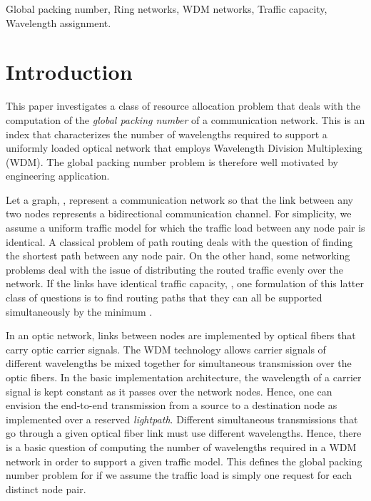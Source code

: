 \documentclass[journal,draftcls,onecolumn,12pt,twoside]{IEEEtran}
\begin{document}
\begin{IEEEkeywords}
Global packing number, Ring networks, WDM networks, Traffic capacity, Wavelength assignment.
\end{IEEEkeywords}


\section{Introduction} \label{sec:intro}



This paper investigates a class of resource allocation problem that deals with the computation of the {\em global packing number} of a communication network.  This
is an index that characterizes the number of wavelengths required to support a uniformly loaded optical network that employs Wavelength Division Multiplexing (WDM).  The global packing number problem is therefore well motivated by engineering application.

Let a graph, , represent a communication network so that the link between any two nodes represents a bidirectional communication channel.  
For simplicity, we assume a uniform traffic model for which the
traffic load between any node pair is identical.   
A classical problem of path routing deals with the question of finding the shortest path between any node pair.   
On the other hand, some networking problems deal with the issue of distributing the routed traffic evenly over the network.   
If the links have identical traffic capacity, , one formulation of this latter class of questions is to find routing paths that they can all be supported simultaneously by the minimum . 
 
In an optic network, links between nodes are implemented by optical fibers that carry optic carrier signals.   
The WDM technology \cite{GY_04,LXC_05,S_10,SSA_02} allows carrier signals of different wavelengths be mixed together for simultaneous transmission over the optic fibers.  
In the basic implementation architecture, the wavelength of a carrier signal is kept constant as it passes over the network nodes.  
Hence, one can envision the end-to-end transmission from a source to a destination node as implemented over a reserved {\em lightpath}.  
Different simultaneous transmissions that go through a given optical fiber link must use different wavelengths.  
Hence, there is a basic question of computing the number of wavelengths required in a WDM network in order to support a given traffic model.  
This defines the global packing number problem for  if we assume the traffic load
is simply one request for each distinct node pair. 
 
\end{document}
